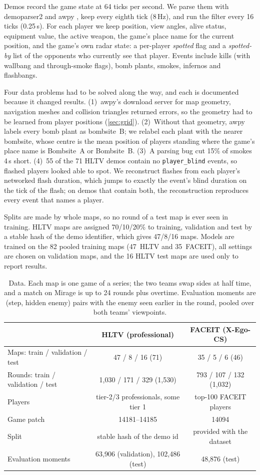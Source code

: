 \documentclass[11pt]{article}
\newcommand{\1}{\mathbb{1}}
\begin{document}
Demos record the game state at 64 ticks per second. We parse them with demoparser2 and awpy \citep{demoparser,awpy}, keep every eighth tick (8\,Hz), and run the filter every 16 ticks (0.25\,s). For each player we keep position, view angles, alive status, equipment value, the active weapon, the game's place name for the current position, and the game's own radar state: a per-player \emph{spotted} flag and a \emph{spotted-by} list of the opponents who currently see that player. Events include kills (with wallbang and through-smoke flags), bomb plants, smokes, infernos and flashbangs.

Four data problems had to be solved along the way, and each is documented because it changed results. (1)~awpy's download server for map geometry, navigation meshes and collision triangles returned errors, so the geometry had to be learned from player positions (\cref{sec:grid}). (2)~Without that geometry, awpy labels every bomb plant as bombsite~B; we relabel each plant with the nearer bombsite, whose centre is the mean position of players standing where the game's place name is Bombsite~A or Bombsite~B. (3)~A parsing bug cut 15\% of smokes 4\,s short. (4)~55 of the 71 HLTV demos contain no \texttt{player\_blind} events, so flashed players looked able to spot. We reconstruct flashes from each player's networked flash duration, which jumps to exactly the event's blind duration on the tick of the flash; on demos that contain both, the reconstruction reproduces every event that names a player.

Splits are made by whole maps, so no round of a test map is ever seen in training. HLTV maps are assigned 70/10/20\% to training, validation and test by a stable hash of the demo identifier, which gives 47/8/16 maps. Models are trained on the 82 pooled training maps (47~HLTV and 35~FACEIT), all settings are chosen on validation maps, and the 16 HLTV test maps are used only to report results.

\begin{table}[t]
\centering
\caption{Data. Each map is one game of a series; the two teams swap sides at half time, and a match on Mirage is up to 24 rounds plus overtime. Evaluation moments are (step, hidden enemy) pairs with the enemy seen earlier in the round, pooled over both teams' viewpoints.}
\label{tab:data}
\small
\begin{tabular}{@{}lcc@{}}
\toprule
 & HLTV (professional) & FACEIT (X-Ego-CS) \\
\midrule
Maps: train / validation / test & 47 / 8 / 16 \;(71) & 35 / 5 / 6 \;(46) \\
Rounds: train / validation / test & 1{,}030 / 171 / 329 \;(1{,}530) & 793 / 107 / 132 \;(1{,}032) \\
Players & tier-2/3 professionals, some tier 1 & top-100 FACEIT players \\
Game patch & 14181--14185 & 14094 \\
Split & stable hash of the demo id & provided with the dataset \\
Evaluation moments & 63{,}906 (validation), 102{,}486 (test) & 48{,}876 (test) \\
\bottomrule
\end{tabular}
\end{table}
\end{document}
